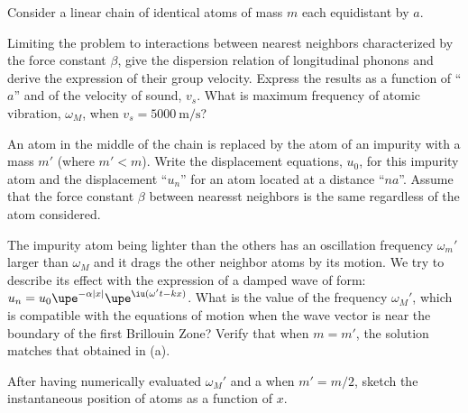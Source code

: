\clearpage

\begin{problem}
  Consider a linear chain of identical atoms of mass $m$ each equidistant by $a$.
  \begin{enumext}[label = (\alph*)]
    \item Limiting the problem to interactions between nearest neighbors characterized by the force constant $\beta$, give the dispersion relation of longitudinal phonons and derive the expression of their group velocity.
    Express the results as a function of ``$a$'' and of the velocity of sound, $v_s$.
    What is maximum frequency of atomic vibration, $\omega_M$, when $v_s = \qty{5000}{\m/\s}$?
    \item An atom in the middle of the chain is replaced by the atom of an impurity with a mass $m'$ (where $m' < m$).
    Write the displacement equations, $u_0$, for this impurity atom and the displacement ``$u_n$'' for an atom located at a distance ``$na$''.
    Assume that the force constant $\beta$ between nearesst neighbors is the same regardless of the atom considered.
    \item The impurity atom being lighter than the others has an oscillation frequency $\omega_m'$ larger than $\omega_M$ and it drags the other neighbor atoms by its motion. We try to describe its effect with the expression of a damped wave of form: $u_n = u_0\upe^{-\alpha|x|} \upe^{\iu(\omega't-kx)}$.
    What is the value of the frequency $\omega_M'$, which is compatible with the equations of motion when the wave vector is near the boundary of the first Brillouin Zone? Verify that when $m = m'$, the solution matches that obtained in (a).
    \item After having numerically evaluated $\omega_M'$ and a when $m' = m/2$,
    sketch the instantaneous position of atoms as a function of $x$.
  \end{enumext}
\end{problem}
